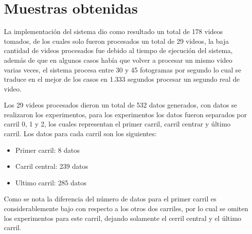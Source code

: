 \section{Muestras obtenidas}

La implementación del sistema dio como resultado un total de 178 videos tomados, de los cuales solo fueron procesados un total de 29 videos, la baja cantidad de videos procesados fue debido al tiempo de ejecución del sistema, además de que en algunos casos había que volver a procesar un mismo video varias veces, el sistema procesa entre 30 y 45 fotogramas por segundo lo cual se traduce en el mejor de los casos en 1.333 segundos procesar un segundo real de video.

Los 29 videos procesados dieron un total de 532 datos generados, con datos se realizaron los experimentos, para los experimentos los datos fueron separados por carril 0, 1 y 2, los cuales representan el primer carril, carril centrar y último carril. Los datos para cada carril son los siguientes:

\begin{itemize}
    \item Primer carril: 8 datos
    \item Carril central: 239 datos
    \item Ultimo carril: 285 datos
\end{itemize}

Como se nota la diferencia del número de datos para el primer carril es considerablemente bajo con respecto a los otros dos carriles, por lo cual se omiten los experimentos para este carril, dejando solamente el cerril central y el último carril.
